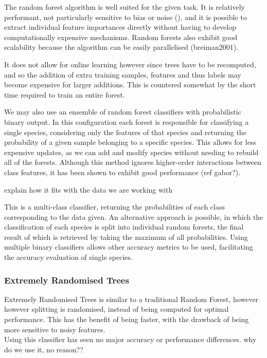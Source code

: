 The random forest algorithm is well suited for the given task.
It is relatively performant, not particularly sensitive to bias or noise (\textcite{marko2004}),
and it is possible to extract individual feature importances directly without
having to develop computationally expensive mechanisms.
Random forests also exhibit good scalability because the algorithm can be easily
parallelised (breiman2001).

It does not allow for online learning however since trees have to be recomputed, 
and so the addition of extra training samples, features and thus labels may
become expensive for larger additions.
This is countered somewhat by the short time required to train an entire forest.

We may also use an ensemble of random forest classifiers with probabilistic
binary output.
In this configuration each forest is responsible for classifying a single
species, considering only the features of that species and returning the
probability of a given sample belonging to a specific species.
This allows for less expensive updates, as we can add and modify species without
needing to rebuild all of the forests.
Although this method ignores higher-order interactions between class features,
it has been shown to exhibit good performance (ref gabor?).


explain how it fits with the data we are working with

This is a multi-class classifier, returning the probabilities of each class
corresponding to the data given.
An alternative approach is possible, in which the classification of each species
is split into individual random forests, the final result of which is retrieved
by taking the maximum of all probabilities.
Using multiple binary classifiers allows other accuracy metrics to be used,
facilitating the accuracy evaluation of single species.

\subsubsection{Extremely Randomised Trees}
Extremely Randomised Trees is similar to a traditional Random Forest, however
however splitting is randomised, instead of being computed for optimal
performance.
This has the benefit of being faster, with the drawback of being more sensitive
to noisy features.\\

Using this classifier has seen no major accuracy or performance differences.
why do we use it, no reason??

